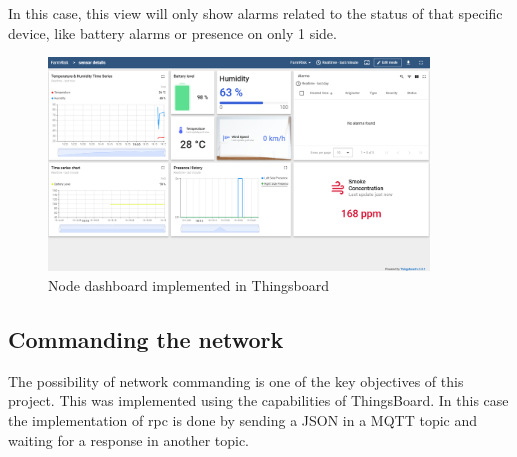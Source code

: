 \begin{itemize}
    In this case, this view will only show alarms related to the status of that specific device, like battery alarms or presence on only 1 side.
    \begin{figure}[H]
        \centering
        \includegraphics[width=0.9\textwidth]{./images/8/NodeDashboard.png}
        \caption{Node dashboard implemented in Thingsboard}
        \label{fig:NodeThingsboard}
    \end{figure}
\end{itemize}
\clearpage
\subsection{Commanding the network}

The possibility of network commanding is one of the key objectives of this project. This was implemented using the  capabilities of ThingsBoard. 
In this case the implementation of \acrshort{rpc} is done by sending a JSON in a MQTT topic and waiting for a response in another topic.

